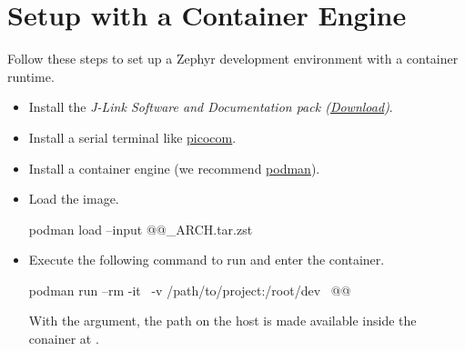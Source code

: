 \section{Setup with a Container Engine}
\label{setupwithcontainerengine}

Follow these steps to set up a Zephyr development environment with a container runtime.

\begin{itemize}
  \item Install the \emph{J-Link Software and Documentation pack (\href{https://www.segger.com/downloads/jlink}{Download})}.
  \item Install a serial terminal like \href{https://formulae.brew.sh/formula/picocom}{picocom}.
  \item Install a container engine (we recommend \href{https://podman.io/docs/installation}{podman}).
  \item Load the image.
        \begin{monobox}
podman load --input @\imagename{}@_ARCH.tar.zst
\end{monobox}
  \item Execute the following command to run and enter the container.
        \begin{monobox}
podman run --rm -it \
  -v /path/to/project:/root/dev \
  @\imagename{}@
\end{monobox}
    With the  argument, the  path on the host is made available inside the conainer at .
\end{itemize}
